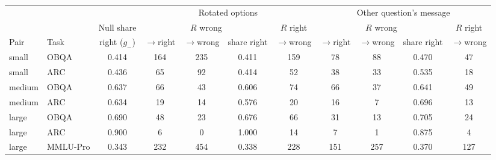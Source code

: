 \begin{table}[!htbp]
\begin{tabular*}{\linewidth}{@{}ll@{\hspace{5pt}\extracolsep{\fill}}ccccccccc@{}}
& & & \multicolumn{4}{c}{Rotated options} & \multicolumn{4}{c}{Other question's message}\\\cmidrule(lr){4-7}\cmidrule(l){8-11}
& & Null share & \multicolumn{3}{c}{$R$ wrong} & $R$ right & \multicolumn{3}{c}{$R$ wrong} & $R$ right\\\cmidrule(lr){4-6}\cmidrule(lr){7-7}\cmidrule(lr){8-10}\cmidrule(l){11-11}
Pair & Task & right ($g_-$) & $\to$right & $\to$wrong & share right & $\to$wrong & $\to$right & $\to$wrong & share right & $\to$wrong\\\midrule
small & OBQA & 0.414 & 164 & 235 & 0.411 & 159 & 78 & 88 & 0.470 & 47\\
small & ARC & 0.436 & 65 & 92 & 0.414 & 52 & 38 & 33 & 0.535 & 18\\
medium & OBQA & 0.637 & 66 & 43 & 0.606 & 74 & 66 & 37 & 0.641 & 49\\
medium & ARC & 0.634 & 19 & 14 & 0.576 & 20 & 16 & 7 & 0.696 & 13\\
large & OBQA & 0.690 & 48 & 23 & 0.676 & 66 & 31 & 13 & 0.705 & 24\\
large & ARC & 0.900 & 6 & 0 & 1.000 & 14 & 7 & 1 & 0.875 & 4\\
large & MMLU-Pro & 0.343 & 232 & 454 & 0.338 & 228 & 151 & 257 & 0.370 & 127\\\bottomrule
\end{tabular*}
\end{table}

